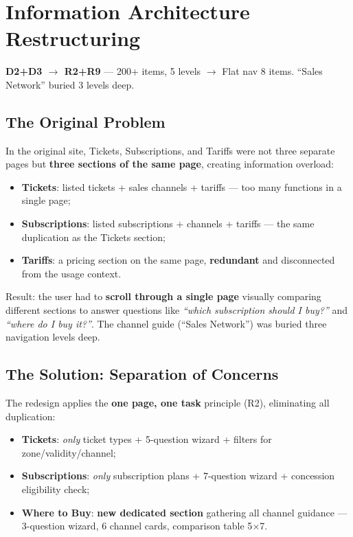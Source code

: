 \vspace{0.3cm}

\section{Information Architecture Restructuring}
\label{sec:comparison-ia-3v3}

\textbf{D2+D3 $\rightarrow$ R2+R9} --- 200+ items, 5 levels $\rightarrow$ Flat nav 8 items. ``Sales Network'' buried 3 levels deep.

\subsection*{The Original Problem}

In the original site, Tickets, Subscriptions, and Tariffs were not three separate pages but \textbf{three sections of the same page}, creating information overload:

\begin{itemize}[nosep]
    \item \textbf{Tickets}: listed tickets + sales channels + tariffs --- too many functions in a single page;
    \item \textbf{Subscriptions}: listed subscriptions + channels + tariffs --- the same duplication as the Tickets section;
    \item \textbf{Tariffs}: a pricing section on the same page, \textbf{redundant} and disconnected from the usage context.
\end{itemize}

Result: the user had to \textbf{scroll through a single page} visually comparing different sections to answer questions like \textit{``which subscription should I buy?''} and \textit{``where do I buy it?''}. The channel guide (``Sales Network'') was buried three navigation levels deep.

\subsection*{The Solution: Separation of Concerns}

The redesign applies the \textbf{one page, one task} principle (R2), eliminating all duplication:

\begin{itemize}[nosep]
    \item \textbf{Tickets}: \textit{only} ticket types + 5-question wizard + filters for zone/validity/channel;
    \item \textbf{Subscriptions}: \textit{only} subscription plans + 7-question wizard + concession eligibility check;
    \item \textbf{Where to Buy}: \textbf{new dedicated section} gathering all channel guidance --- 3-question wizard, 6 channel cards, comparison table 5$\times$7.
\end{itemize}

